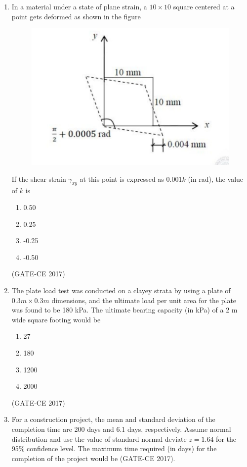 \documentclass[journal,12pt,onecolumn]{article}
\theoremstyle{remark}
\begin{document}
\begin{enumerate}
    \item In a material under a state of plane strain, a $10 \times 10$ square centered at a point gets deformed as shown in the figure 
    \begin{figure}[H]
    \centering
    \includegraphics[width=0.7\columnwidth]{q16.jpg}  
    \caption{}
    \label{fig:6}
    \end{figure}
    If the shear strain $ \gamma_{xy} $ at this point is expressed as $0.001k$ (in rad), the value of $ k $ is
    \begin{multicols}{4}
    \begin{enumerate}
        \item 0.50  
        \item 0.25  
        \item -0.25  
        \item -0.50  
    \end{enumerate}
    \end{multicols}
    \hfill (GATE-CE 2017)

    \item The plate load test was conducted on a clayey strata by using a plate of $0.3m\times0.3m$ dimensions, and the ultimate load per unit area for the plate was found to be 180 kPa. The ultimate bearing capacity (in kPa) of a 2 m wide square footing would be
    \begin{multicols}{4}
    \begin{enumerate}
        \item 27  
        \item 180  
        \item 1200  
        \item 2000  
    \end{enumerate}
    \end{multicols}
    \hfill (GATE-CE 2017)

    \item For a construction project, the mean and standard deviation of the completion time are 200 days and 6.1 days, respectively. Assume normal distribution and use the value of standard normal deviate $ z = 1.64 $ for the 95\% confidence level. The maximum time required (in days) for the completion of the project would be \underline{\hspace{3cm}} \hfill (GATE-CE 2017).


\end{enumerate}
\end{document}
